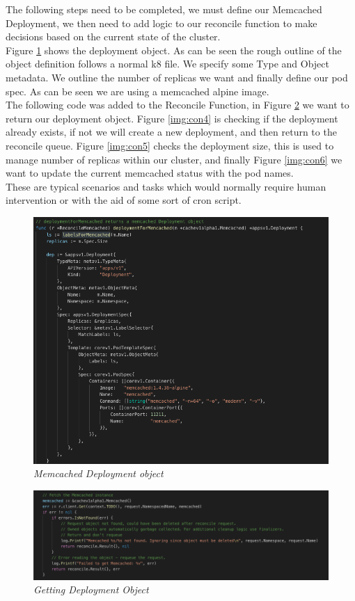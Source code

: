 The following steps need to be completed, we must define our Memcached Deployment, we then need to add logic to our reconcile function to make decisions based on the current state of the cluster.
\\Figure \ref{img:con2} shows the deployment object. As can be seen the rough outline of the object definition follows a normal k8 file. We specify some Type and Object metadata. We outline the number of replicas we want and finally define our pod spec. As can be seen we are using a memcached alpine image.
\\The following code was added to the Reconcile Function, in Figure \ref{img:con3} we want to return our deployment object. Figure \ref{img:con4} is checking if the deployment already exists, if not we will create a new deployment, and then return to the reconcile queue. Figure \ref{img:con5} checks the deployment size, this is used to manage number of replicas within our cluster, and finally Figure \ref{img:con6} we want to update the current memcached status with the pod names.
\\These are typical scenarios and tasks which would normally require human intervention or with the aid of some sort of cron script.
\begin{figure}[!ht]
\centering
\includegraphics*[width=1\textwidth]{images/con2.png}
\caption{\em Memcached Deployment object}
\label{img:con2}
\end{figure}

\begin{figure}[!ht]
\centering
\includegraphics*[width=1\textwidth]{images/con3.png}
\caption{\em Getting Deployment Object}
\label{img:con3}
\end{figure}

